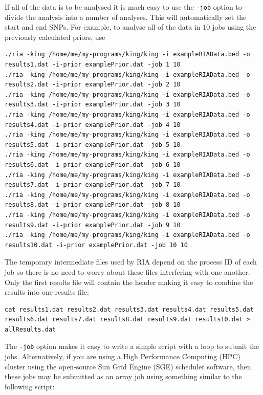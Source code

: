 \documentclass[a4paper,12pt]{article}
\newcommand{\code}[1]{{\footnotesize{{\tt #1}}}}
\begin{document}
If all of the data is to be analysed it is much easy to use the \code{-job} option to divide the analysis into a number of analyses. This will automatically set the start and end SNPs. For example, to analyse all of the data in 10 jobs using the previously calculated priors, use 
\vspace{0.35cm} \begin{lstlisting}
./ria -king /home/me/my-programs/king/king -i exampleRIAData.bed -o results1.dat -i-prior examplePrior.dat -job 1 10
./ria -king /home/me/my-programs/king/king -i exampleRIAData.bed -o results2.dat -i-prior examplePrior.dat -job 2 10
./ria -king /home/me/my-programs/king/king -i exampleRIAData.bed -o results3.dat -i-prior examplePrior.dat -job 3 10
./ria -king /home/me/my-programs/king/king -i exampleRIAData.bed -o results4.dat -i-prior examplePrior.dat -job 4 10
./ria -king /home/me/my-programs/king/king -i exampleRIAData.bed -o results5.dat -i-prior examplePrior.dat -job 5 10
./ria -king /home/me/my-programs/king/king -i exampleRIAData.bed -o results6.dat -i-prior examplePrior.dat -job 6 10
./ria -king /home/me/my-programs/king/king -i exampleRIAData.bed -o results7.dat -i-prior examplePrior.dat -job 7 10
./ria -king /home/me/my-programs/king/king -i exampleRIAData.bed -o results8.dat -i-prior examplePrior.dat -job 8 10
./ria -king /home/me/my-programs/king/king -i exampleRIAData.bed -o results9.dat -i-prior examplePrior.dat -job 9 10
./ria -king /home/me/my-programs/king/king -i exampleRIAData.bed -o results10.dat -i-prior examplePrior.dat -job 10 10

\end{lstlisting} \vspace{0.35cm}
The temporary intermediate files used by RIA depend on the process ID of each job so there is no need to worry about these files interfering with one another. Only the first results file will contain the header making it easy to combine the results into one results file: 
\vspace{0.35cm} \begin{lstlisting}
cat results1.dat results2.dat results3.dat results4.dat results5.dat results6.dat results7.dat results8.dat results9.dat results10.dat > allResults.dat

\end{lstlisting} \vspace{0.35cm}
The \code{-job} option makes it easy to write a simple script with a loop to submit the jobs. Alternatively, if you are using a High Performance Computing (HPC) cluster using the open-source Sun Grid Engine (SGE) scheduler software, then these jobs may be submitted as an array job using something similar to the following script: 
\end{document}
